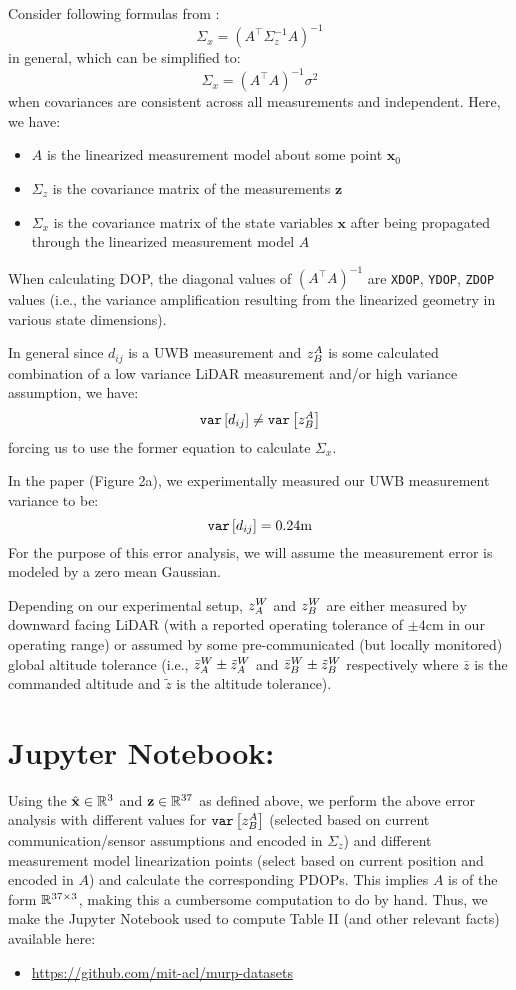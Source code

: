 \documentclass[12pt,letterpaper]{article}
\begin{document}
Consider following formulas from \cite{langley1999dilution}:
$$\Sigma_x = (A^\top \Sigma_z^{-1} A)^{-1}$$
in general, which can be simplified to:
$$\Sigma_x = (A^\top A)^{-1} \sigma^2$$
when covariances are consistent across all measurements and independent. Here, we have:
\begin{itemize}
    \item $A$ is the linearized measurement model about some point $\mathbf{x}_0$
    \item $\Sigma_z$ is the covariance matrix of the measurements $\mathbf{z}$
    \item $\Sigma_x$ is the covariance matrix of the state variables $\mathbf{x}$ after being propagated through the linearized measurement model $A$
\end{itemize}

When calculating DOP, the diagonal values of $(A^\top A)^{-1}$ are \texttt{XDOP}, \texttt{YDOP}, \texttt{ZDOP} values (i.e., the variance amplification resulting from the linearized geometry in various state dimensions).

In general since $d_{ij}$ is a UWB measurement and $z^{A}_{B}$ is some calculated combination of a low variance LiDAR measurement and/or high variance assumption, we have:
$$\texttt{var}\left[d_{ij}\right] \neq \texttt{var}\left[z^{A}_{B}\right]$$
forcing us to use the former equation to calculate $\Sigma_x$. 

In the paper (Figure 2a), we experimentally measured our UWB measurement variance to be:
$$\texttt{var}\left[d_{ij}\right] = 0.24\text{m}$$
For the purpose of this error analysis, we will assume the measurement error is modeled by a zero mean Gaussian.

Depending on our experimental setup, $z^{W}_{A}$ and $z^{W}_{B}$ are either measured by downward facing LiDAR (with a reported operating tolerance of $\pm 4\text{cm}$ in our operating range) or assumed by some pre-communicated (but locally monitored) global altitude tolerance (i.e., $\bar{z}^{W}_{A} \pm \tilde{z}^{W}_{A}$ and $\bar{z}^{W}_{B} \pm \tilde{z}^{W}_{B}$ respectively where $\bar{z}$ is the commanded altitude and $\tilde{z}$ is the altitude tolerance).

\clearpage
\section{Jupyter Notebook:}

Using the $\hat{\mathbf{x}} \in \mathbb{R}^3$ and $\mathbf{z} \in \mathbb{R}^{37}$ as defined above, we perform the above error analysis with different values for $\texttt{var}\left[z^{A}_{B}\right]$ (selected based on current communication/sensor assumptions and encoded in $\Sigma_z$) and different measurement model linearization points (select based on current position and encoded in $A$) and calculate the corresponding PDOPs. This implies $A$ is of the form $\mathbb{R}^{37 \times 3}$, making this a cumbersome computation to do by hand. Thus, we make the Jupyter Notebook used to compute Table II (and other relevant facts) available here:
\begin{itemize}
\item \url{https://github.com/mit-acl/murp-datasets}
\end{itemize}



\end{document}
